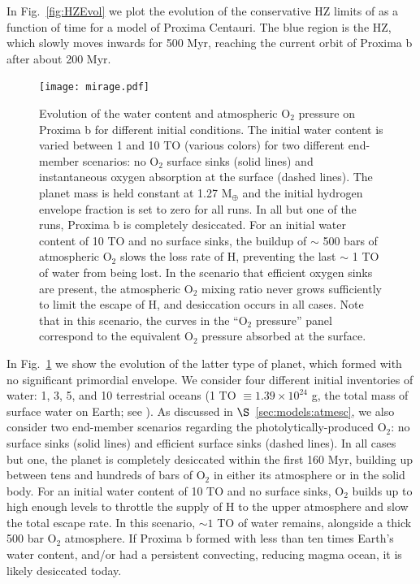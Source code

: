 \documentclass[preprint,12pt]{aastex}
\begin{document}
In Fig.~\ref{fig:HZEvol} we plot the evolution of the conservative HZ limits of \cite{Kopparapu13} as a function of time for a model of Proxima Centauri. The blue region is the HZ, which slowly moves inwards for 500 Myr, reaching the current orbit of Proxima b after about 200 Myr.

\begin{figure}[ht]
\centering
\texttt{[image: mirage.pdf]}
\caption{Evolution of the water content and atmospheric O$_2$ pressure
  on Proxima b for different initial conditions. The initial water
  content is varied between 1 and 10 TO (various colors) for two
  different end-member scenarios: no O$_2$ surface sinks (solid lines)
  and instantaneous oxygen absorption at the surface (dashed
  lines). The planet mass is held constant at 1.27 M$_\oplus$ and the
  initial hydrogen envelope fraction is set to zero for all runs. In
  all but one of the runs, Proxima b is completely desiccated. For an
  initial water content of 10 TO and no surface sinks, the buildup of
  $\sim$ 500 bars of atmospheric O$_2$ slows the loss rate of H,
  preventing the last $\sim$ 1 TO of water from being lost. In the
  scenario that efficient oxygen sinks are present, the atmospheric
  O$_2$ mixing ratio never grows sufficiently to limit the escape of
  H, and desiccation occurs in all cases. Note that in this scenario,
  the curves in the ``O$_2$ pressure'' panel correspond to the
  equivalent O$_2$ pressure absorbed at the surface.}
\label{fig:atmesc:mirage}
\end{figure}

In Fig.~\ref{fig:atmesc:mirage} we show the evolution of the latter
type of planet, which formed with no significant primordial
envelope. We consider four different initial inventories of water: 1,
3, 5, and 10 terrestrial oceans (1 TO $\equiv 1.39\times 10^{24}$ g,
the total mass of surface water on Earth; see \cite{Kasting88}). As
discussed in $\S$~\ref{sec:models:atmesc}, we also consider two end-member
scenarios regarding the photolytically-produced O$_2$: no surface
sinks (solid lines) and efficient surface sinks (dashed lines). In all
cases but one, the planet is completely desiccated within the first
160 Myr, building up between tens and hundreds of bars of O$_2$ in
either its atmosphere or in the solid body. For an initial water
content of 10 TO and no surface sinks, O$_2$ builds up to high enough
levels to throttle the supply of H to the upper atmosphere and slow
the total escape rate. In this scenario, $\sim 1$ TO of water remains,
alongside a thick 500 bar O$_2$ atmosphere. If Proxima b formed with
less than ten times Earth's water content, and/or had a persistent
convecting, reducing magma ocean, it is likely desiccated today.
\end{document}
